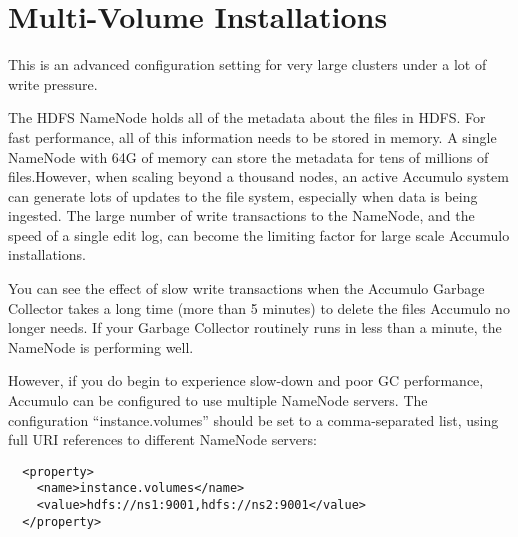 
%
%

\chapter{Multi-Volume Installations}

This is an advanced configuration setting for very large clusters
under a lot of write pressure.

The HDFS NameNode holds all of the metadata about the files in
HDFS. For fast performance, all of this information needs to be stored
in memory.  A single NameNode with 64G of memory can store the
metadata for tens of millions of files.However, when scaling beyond a
thousand nodes, an active Accumulo system can generate lots of updates
to the file system, especially when data is being ingested.  The large
number of write transactions to the NameNode, and the speed of a
single edit log, can become the limiting factor for large scale
Accumulo installations.

You can see the effect of slow write transactions when the Accumulo
Garbage Collector takes a long time (more than 5 minutes) to delete
the files Accumulo no longer needs.  If your Garbage Collector
routinely runs in less than a minute, the NameNode is performing well.

However, if you do begin to experience slow-down and poor GC
performance, Accumulo can be configured to use multiple NameNode
servers.  The configuration ``instance.volumes'' should be set to a
comma-separated list, using full URI references to different NameNode
servers:

\small
\begin{verbatim}
  <property>
    <name>instance.volumes</name>
    <value>hdfs://ns1:9001,hdfs://ns2:9001</value>
  </property>
\end{verbatim}
\normalsize


